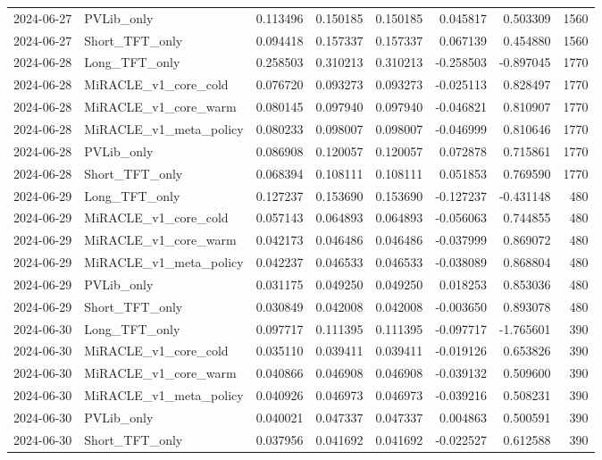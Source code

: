 \begin{tabular}{llrrrrrr}
2024-06-27 & PVLib_only & 0.113496 & 0.150185 & 0.150185 & 0.045817 & 0.503309 & 1560 \\
2024-06-27 & Short_TFT_only & 0.094418 & 0.157337 & 0.157337 & 0.067139 & 0.454880 & 1560 \\
2024-06-28 & Long_TFT_only & 0.258503 & 0.310213 & 0.310213 & -0.258503 & -0.897045 & 1770 \\
2024-06-28 & MiRACLE_v1_core_cold & 0.076720 & 0.093273 & 0.093273 & -0.025113 & 0.828497 & 1770 \\
2024-06-28 & MiRACLE_v1_core_warm & 0.080145 & 0.097940 & 0.097940 & -0.046821 & 0.810907 & 1770 \\
2024-06-28 & MiRACLE_v1_meta_policy & 0.080233 & 0.098007 & 0.098007 & -0.046999 & 0.810646 & 1770 \\
2024-06-28 & PVLib_only & 0.086908 & 0.120057 & 0.120057 & 0.072878 & 0.715861 & 1770 \\
2024-06-28 & Short_TFT_only & 0.068394 & 0.108111 & 0.108111 & 0.051853 & 0.769590 & 1770 \\
2024-06-29 & Long_TFT_only & 0.127237 & 0.153690 & 0.153690 & -0.127237 & -0.431148 & 480 \\
2024-06-29 & MiRACLE_v1_core_cold & 0.057143 & 0.064893 & 0.064893 & -0.056063 & 0.744855 & 480 \\
2024-06-29 & MiRACLE_v1_core_warm & 0.042173 & 0.046486 & 0.046486 & -0.037999 & 0.869072 & 480 \\
2024-06-29 & MiRACLE_v1_meta_policy & 0.042237 & 0.046533 & 0.046533 & -0.038089 & 0.868804 & 480 \\
2024-06-29 & PVLib_only & 0.031175 & 0.049250 & 0.049250 & 0.018253 & 0.853036 & 480 \\
2024-06-29 & Short_TFT_only & 0.030849 & 0.042008 & 0.042008 & -0.003650 & 0.893078 & 480 \\
2024-06-30 & Long_TFT_only & 0.097717 & 0.111395 & 0.111395 & -0.097717 & -1.765601 & 390 \\
2024-06-30 & MiRACLE_v1_core_cold & 0.035110 & 0.039411 & 0.039411 & -0.019126 & 0.653826 & 390 \\
2024-06-30 & MiRACLE_v1_core_warm & 0.040866 & 0.046908 & 0.046908 & -0.039132 & 0.509600 & 390 \\
2024-06-30 & MiRACLE_v1_meta_policy & 0.040926 & 0.046973 & 0.046973 & -0.039216 & 0.508231 & 390 \\
2024-06-30 & PVLib_only & 0.040021 & 0.047337 & 0.047337 & 0.004863 & 0.500591 & 390 \\
2024-06-30 & Short_TFT_only & 0.037956 & 0.041692 & 0.041692 & -0.022527 & 0.612588 & 390 \\

\end{tabular}
